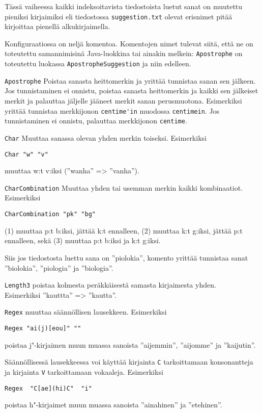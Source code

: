 \documentclass[12pt,a4paper]{scrartcl}
\begin{document}
Tässä vaiheessa kaikki indeksoitavista tiedostoista luetut sanat on
muutettu pieniksi kirjaimiksi eli tiedostossa \verb|suggestion.txt|
olevat erisnimet pitää kirjoittaa pienellä alkukirjaimella.

Konfiguraatiossa on neljä komentoa. Komentojen nimet tulevat siitä,
että ne on toteutettu samannimisinä Java-luokkina tai ainakin melkein:
\verb|Apostrophe| on toteutettu luokassa \verb|ApostropheSuggestion|
ja niin edelleen.

\bigskip
\verb|Apostrophe| Poistaa sanasta heittomerkin ja yrittää tunnistaa
sanan sen jälkeen. Jos tunnistaminen ei onnistu, poistaa sanasta
heittomerkin ja kaikki sen jälkeiset merkit ja palauttaa jäljelle
jääneet merkit sanan perusmuotona. Esimerkiksi yrittää tunnistaa
merkkijonon \verb|centime'in| muodossa \verb|centimein|. Jos
tunnistaminen ei onnistu, palauttaa merkkijonon \verb|centime|.

\bigskip
\verb|Char| Muuttaa sanassa olevan yhden merkin toiseksi. Esimerkiksi

\verb|Char "w" "v"|

muuttaa w:t v:iksi (''wanha'' => ''vanha'').

\bigskip
\verb|CharCombination| Muuttaa yhden tai usemman merkin kaikki
kombinaatiot. Esimerkiksi

\verb|CharCombination "pk" "bg"|

(1) muuttaa p:t b:iksi, jättää k:t ennalleen,
(2) muuttaa k:t g:iksi, jättää p:t ennalleen, sekä
(3) muuttaa p:t b:iksi ja k:t g:iksi.

Siis jos tiedostosta luettu sana on ''piolokia'', komento yrittää
 tunnistaa sanat ''biolokia'', ''piologia'' ja ''biologia''.


\bigskip
\verb|Length3| poistaa kolmesta peräkkäisestä samasta kirjaimesta
yhden. \\ Esimerkiksi ''kauttta'' => ''kautta''.


\bigskip
\verb|Regex| muuttaa säännöllisen lausekkeen. Esimerkiksi

\verb|Regex "ai(j)[eou]" ""|

poistaa j"-kirjaimen muun muassa sanoista ''aijemmin'', ''aijomme'' ja
''kaijutin''.


Säännöllisessä lausekkeessa voi käyttää kirjainta \verb|C|
tarkoittamaan konsonantteja ja kirjainta \verb|V| tarkoittamaan
vokaaleja. Esimerkiksi

\verb|Regex  "C[ae](hi)C"  "i"|

poistaa h"-kirjaimet muun muassa sanoista ''ainahinen'' ja
''etehinen''.
\end{document}
